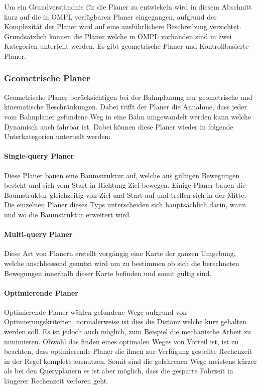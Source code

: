 Um ein Grundverständnis für die Planer zu entwickeln wird in diesem Abschnitt kurz auf die in OMPL verfügbaren Planer eingegangen, aufgrund der Komplexität der Planer wird auf eine ausführlichere Beschreibung verzichtet. 
Grundsätzlich können die Planer welche in \gls{OMPL} vorhanden sind in zwei Kategorien unterteilt werden. Es gibt geometrische Planer und Kontrollbasierte Planer.\cite{Availabl94:online}
\subsubsection{Geometrische Planer}
Geometrische Planer berücksichtigen bei der Bahnplanung nur geometrische und kinematische Beschränkungen. Dabei trifft der Planer die Annahme, dass jeder vom Bahnplaner gefundene Weg in eine Bahn umgewandelt werden kann welche Dynamisch auch fahrbar ist. Dabei können diese Planer wieder  in folgende Unterkategorien unterteilt werden:\cite{Availabl94:online}
\paragraph{Single-query Planer} Diese Planer bauen eine Baumstruktur auf, welche aus gültigen Bewegungen besteht und sich vom Start in Richtung Ziel bewegen. Einige Planer bauen die Baumstruktur gleichzeitig von Ziel und Start auf und treffen sich in der Mitte. Die einzelnen Planer dieses Typs unterscheiden sich hauptsächlich darin, wann und wo die Baumstruktur erweitert wird.\cite{Availabl94:online}
\paragraph{Multi-query Planer} Diese Art von Planern erstellt vorgängig eine Karte der ganzen Umgebung, welche anschliessend genutzt wird um zu bestimmen ob sich die berechneten Bewegungen innerhalb dieser Karte befinden und somit gültig sind.\cite{Availabl94:online}
\paragraph{Optimierende Planer} Optimierende Planer wählen gefundene Wege aufgrund von Optimierungskriterien, normalerweise ist dies die Distanz welche kurz gehalten werden soll. Es ist jedoch auch möglich, zum Beispiel die mechanische Arbeit zu minimieren. Obwohl das finden eines optimalen Weges von Vorteil ist, ist zu beachten, dass optimierende Planer die ihnen zur Verfügung gestellte Rechenzeit in der Regel komplett ausnutzen. Somit sind die gefahrenen Wege meistens kürzer als bei den Queryplanern es ist aber möglich, dass die gesparte Fahrzeit in längerer Rechenzeit verloren geht.\cite{Lav06}

